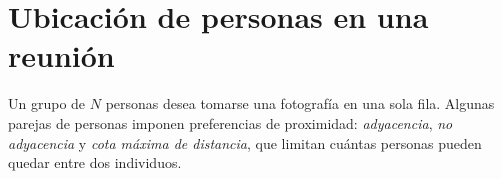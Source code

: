
\section{Ubicación de personas en una reunión}\label{sec:05-reunion}
Un grupo de \(N\) personas desea tomarse una fotografía en una sola fila. Algunas parejas de personas imponen preferencias de proximidad: \emph{adyacencia}, \emph{no adyacencia} y \emph{cota máxima de distancia}, que limitan cuántas personas pueden quedar entre dos individuos.